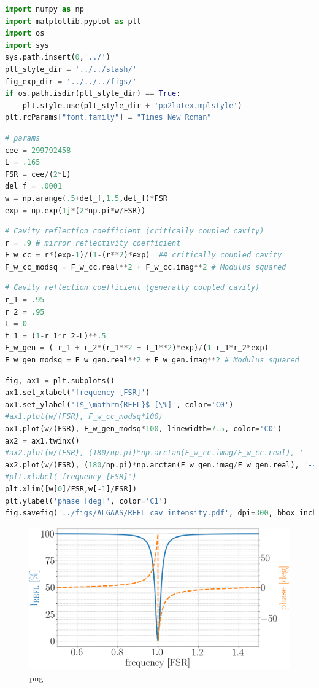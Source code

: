 \begin{lstlisting}[language=Python]
import numpy as np
import matplotlib.pyplot as plt
import os
import sys
sys.path.insert(0,'../')
plt_style_dir = '../../stash/'
fig_exp_dir = '../../../figs/'
if os.path.isdir(plt_style_dir) == True:
    plt.style.use(plt_style_dir + 'pp2latex.mplstyle')
plt.rcParams["font.family"] = "Times New Roman"
\end{lstlisting}

\begin{lstlisting}[language=Python]
# params
cee = 299792458
L = .165
FSR = cee/(2*L)
del_f = .0001
w = np.arange(.5+del_f,1.5,del_f)*FSR
exp = np.exp(1j*(2*np.pi*w/FSR))
\end{lstlisting}

\begin{lstlisting}[language=Python]
# Cavity reflection coefficient (critically coupled cavity)
r = .9 # mirror reflectivity coefficient
F_w_cc = r*(exp-1)/(1-(r**2)*exp)  ## critically coupled cavity
F_w_cc_modsq = F_w_cc.real**2 + F_w_cc.imag**2 # Modulus squared
\end{lstlisting}

\begin{lstlisting}[language=Python]
# Cavity reflection coefficient (generally coupled cavity)
r_1 = .95
r_2 = .95
L = 0
t_1 = (1-r_1*r_2-L)**.5
F_w_gen = (-r_1 + r_2*(r_1**2 + t_1**2)*exp)/(1-r_1*r_2*exp)
F_w_gen_modsq = F_w_gen.real**2 + F_w_gen.imag**2 # Modulus squared
\end{lstlisting}

\begin{lstlisting}[language=Python]
fig, ax1 = plt.subplots()
ax1.set_xlabel('frequency [FSR]')
ax1.set_ylabel('I$_\mathrm{REFL}$ [\%]', color='C0')
#ax1.plot(w/(FSR), F_w_cc_modsq*100)
ax1.plot(w/(FSR), F_w_gen_modsq*100, linewidth=7.5, color='C0')
ax2 = ax1.twinx()
#ax2.plot(w/(FSR), (180/np.pi)*np.arctan(F_w_cc.imag/F_w_cc.real), '--')
ax2.plot(w/(FSR), (180/np.pi)*np.arctan(F_w_gen.imag/F_w_gen.real), '--', linewidth=7.5, color='C1')
#plt.xlabel('frequency [FSR]')
plt.xlim([w[0]/FSR,w[-1]/FSR])
plt.ylabel('phase [deg]', color='C1')
fig.savefig('../figs/ALGAAS/REFL_cav_intensity.pdf', dpi=300, bbox_inches='tight')
\end{lstlisting}

\begin{figure}
\centering
\includegraphics{cav_refl_files/cav_refl_4_0.png}
\caption{png}
\end{figure}

\begin{lstlisting}[language=Python]
\end{lstlisting}
